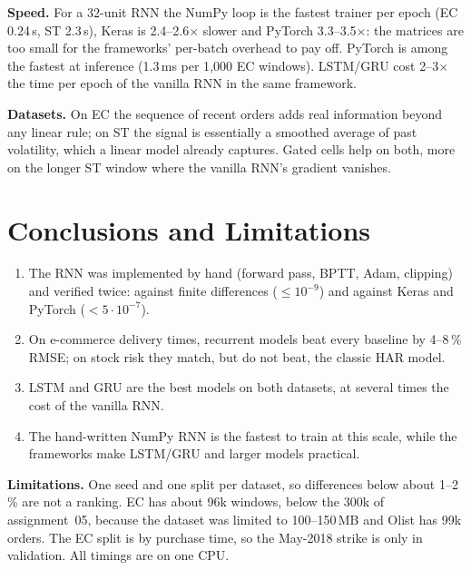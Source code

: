 \documentclass[11pt, a4paper]{article}
\begin{document}
\textbf{Speed.} For a 32-unit RNN the NumPy loop is the fastest trainer per epoch (EC 0.24\,s, ST 2.3\,s), Keras is 2.4--2.6$\times$ slower and PyTorch 3.3--3.5$\times$: the matrices
are too small for the frameworks' per-batch overhead to pay off. PyTorch is among the fastest at inference (1.3\,ms per 1{,}000 EC windows). LSTM/GRU cost 2--3$\times$ the time per epoch of the vanilla RNN in the same framework.

\textbf{Datasets.} On EC the sequence of recent orders adds real information beyond any linear rule; on ST the signal is essentially a smoothed average of past volatility, which a linear
model already captures. Gated cells help on both, more on the longer ST window where the vanilla RNN's gradient vanishes.

\section{Conclusions and Limitations}

\begin{enumerate}
\item The RNN was implemented by hand (forward pass, BPTT, Adam, clipping) and verified twice: against finite differences ($\le10^{-9}$) and against Keras and PyTorch ($<5\cdot10^{-7}$).
\item On e-commerce delivery times, recurrent models beat every baseline by 4--8\,\% RMSE; on stock risk they match, but do not beat, the classic HAR model.
\item LSTM and GRU are the best models on both datasets, at several times the cost of the vanilla RNN.
\item The hand-written NumPy RNN is the fastest to train at this scale, while the frameworks make LSTM/GRU and larger models practical.
\end{enumerate}

\textbf{Limitations.} One seed and one split per dataset, so differences below about 1--2\,\% are not a ranking. EC has about 96k windows, below the 300k of assignment~05, because the dataset
was limited to 100--150\,MB and Olist has 99k orders. The EC split is by purchase time, so the May-2018 strike is only in validation. All timings are on one CPU.
\end{document}
